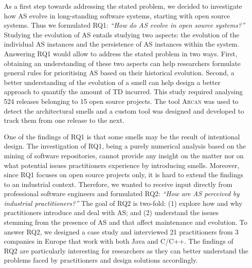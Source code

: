 As a first step towards addressing the stated problem, we decided to investigate how AS evolve in long-standing software systems, starting with open source systems. Thus we formulated RQ1: \textit{``How do AS evolve in open source systems?''} 
Studying the evolution of AS entails studying two aspects: the evolution of the individual AS instances and the persistence of AS instances within the system.
Answering RQ1 would allow to address the stated problem in two ways. First, obtaining an understanding of these two aspects can help researchers formulate general rules for prioritising AS based on their historical evolution.
Second, a better understanding of the evolution of a smell can help design a better approach to quantify the amount of TD incurred.
This study required analysing 524 releases belonging to 15 open source projects.
The tool \textsc{Arcan} was used to detect the architectural smells and a custom tool was designed and developed to track them from one release to the next.

One of the findings of RQ1 is that some smells may be the result of intentional design.
The investigation of RQ1, being a purely numerical analysis based on the mining of software repositories, cannot provide any insight on the matter nor on what potential issues practitioners experience by introducing smells.
Moreover, since RQ1 focuses on open source projects only, it is hard to extend the findings to an industrial context.
Therefore, we wanted to receive input directly from professional software engineers and formulated RQ2: \textit{``How are AS perceived by industrial practitioners?''}
The goal of RQ2 is two-fold: (1) explore how and why practitioners introduce and deal with AS; and (2) understand the issues stemming from the presence of AS and that affect maintenance and evolution. 
To answer RQ2, we designed a case study and interviewed 21 practitioners from 3 companies in Europe that work with both Java and C/C++.
The findings of RQ2 are particularly interesting for researchers as they can better understand the problems faced by practitioners and design solutions accordingly.

